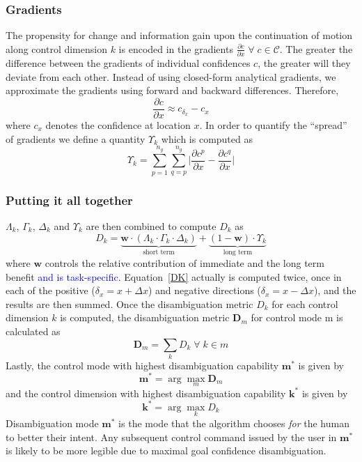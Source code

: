 \documentclass[conference]{IEEEtran}
\newcommand{\argmax}{\arg\!\max}
\begin{document}
\subsubsection{Gradients}
The propensity for change and information gain upon the continuation of motion along control dimension $k$ is encoded in the gradients $\frac{\partial c}{\partial x}\; \forall\; c\in \mathcal{C}$. The greater the difference between the gradients of individual confidences $c$, the greater will they deviate from each other.  Instead of using closed-form analytical gradients, we approximate the gradients using forward and backward differences. Therefore, 
\begin{equation*}
\frac{\partial c}{\partial x} \approx c_{\delta_x} - c_{x} 
\end{equation*}
where $c_x$ denotes the confidence at location $x$.
In order to quantify the ``spread'' of gradients we define a quantity $\Upsilon_{k}$ which is computed as 
\begin{equation*}
\Upsilon_{k} = \sum_{p=1}^{n_g}\sum_{q=p}^{n_g}\Big \lvert\frac{\partial c^p}{\partial x} - \frac{\partial c^q}{\partial x}\Big \rvert
\end{equation*}

\subsubsection*{Putting it all together}
$\Lambda_{k}$, $\Gamma_{k}$, $\Delta_{k}$ and $\Upsilon_{k}$ are then combined to compute $D_{k}$ as 
\begin{equation}\label{DK}
D_{k} = \underbrace{\boldsymbol{w}\cdot(\Lambda_{k}\cdot \Gamma_{k}\cdot \Delta_{k})}_{\text{short term}} + \underbrace{(1 - \boldsymbol{w})\cdot \Upsilon_{k}}_{\text{long term}}
\end{equation}
where $\boldsymbol{w}$ controls the relative contribution of immediate and the long term benefit \textcolor{blue}{and is task-specific}. Equation~\ref{DK} actually is computed twice, once in each of the positive ($\delta_x = x + \Delta x$) and negative directions ($\delta_x = x - \Delta x$), and the results are then summed. 
Once the disambiguation metric $D_k$ for each control dimension $k$ is computed, the disambiguation metric $\boldsymbol{D}_m$ for control mode m is calculated as 
\begin{equation*}
\boldsymbol{D}_m = \sum_{k} D_{k} \; \forall \; k \in m
\end{equation*}
Lastly, the control mode with highest disambiguation capability $\boldsymbol{m}^*$ is given by
\begin{equation*}
\boldsymbol{m}^* = \argmax_m  \boldsymbol{D}_{m}
\end{equation*}
 and the control dimension with highest disambiguation capability $\boldsymbol{k}^{*}$ is given by
\begin{equation*}
\boldsymbol{k}^* = \argmax_k D_k
\end{equation*}
Disambiguation mode $\boldsymbol{m}^{*}$ is the mode that the algorithm chooses \textit{for} the human to better their intent. Any subsequent control command issued by the user in $\boldsymbol{m}^*$ is likely to be more legible due to maximal goal confidence disambiguation.
\end{document}
